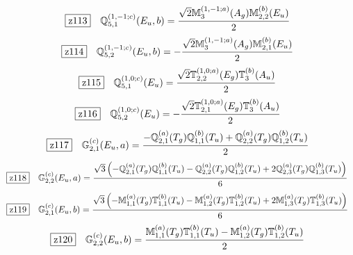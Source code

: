 \documentclass[fleqn,10pt,landscape]{jsarticle}
\begin{document}
\begin{dmath*}
\hspace*{3mm}\fbox{z113}\quad \mathbb{Q}_{5,1}^{(1,-1;c)}(E_{u},b)=\frac{\sqrt{2} \mathbb{M}_{3}^{(1,-1;a)}(A_{g}) \mathbb{M}_{2,2}^{(b)}(E_{u})}{2}
\end{dmath*}
\begin{dmath*}
\hspace*{3mm}\fbox{z114}\quad \mathbb{Q}_{5,2}^{(1,-1;c)}(E_{u},b)=- \frac{\sqrt{2} \mathbb{M}_{3}^{(1,-1;a)}(A_{g}) \mathbb{M}_{2,1}^{(b)}(E_{u})}{2}
\end{dmath*}
\begin{dmath*}
\hspace*{3mm}\fbox{z115}\quad \mathbb{Q}_{5,1}^{(1,0;c)}(E_{u})=\frac{\sqrt{2} \mathbb{T}_{2,2}^{(1,0;a)}(E_{g}) \mathbb{T}_{3}^{(b)}(A_{u})}{2}
\end{dmath*}
\begin{dmath*}
\hspace*{3mm}\fbox{z116}\quad \mathbb{Q}_{5,2}^{(1,0;c)}(E_{u})=- \frac{\sqrt{2} \mathbb{T}_{2,1}^{(1,0;a)}(E_{g}) \mathbb{T}_{3}^{(b)}(A_{u})}{2}
\end{dmath*}
\begin{dmath*}
\hspace*{3mm}\fbox{z117}\quad \mathbb{G}_{2,1}^{(c)}(E_{u},a)=\frac{- \mathbb{Q}_{2,1}^{(a)}(T_{g}) \mathbb{Q}_{1,1}^{(b)}(T_{u}) + \mathbb{Q}_{2,2}^{(a)}(T_{g}) \mathbb{Q}_{1,2}^{(b)}(T_{u})}{2}
\end{dmath*}
\begin{dmath*}
\hspace*{3mm}\fbox{z118}\quad \mathbb{G}_{2,2}^{(c)}(E_{u},a)=\frac{\sqrt{3} \left(- \mathbb{Q}_{2,1}^{(a)}(T_{g}) \mathbb{Q}_{1,1}^{(b)}(T_{u}) - \mathbb{Q}_{2,2}^{(a)}(T_{g}) \mathbb{Q}_{1,2}^{(b)}(T_{u}) + 2 \mathbb{Q}_{2,3}^{(a)}(T_{g}) \mathbb{Q}_{1,3}^{(b)}(T_{u})\right)}{6}
\end{dmath*}
\begin{dmath*}
\hspace*{3mm}\fbox{z119}\quad \mathbb{G}_{2,1}^{(c)}(E_{u},b)=\frac{\sqrt{3} \left(- \mathbb{M}_{1,1}^{(a)}(T_{g}) \mathbb{T}_{1,1}^{(b)}(T_{u}) - \mathbb{M}_{1,2}^{(a)}(T_{g}) \mathbb{T}_{1,2}^{(b)}(T_{u}) + 2 \mathbb{M}_{1,3}^{(a)}(T_{g}) \mathbb{T}_{1,3}^{(b)}(T_{u})\right)}{6}
\end{dmath*}
\begin{dmath*}
\hspace*{3mm}\fbox{z120}\quad \mathbb{G}_{2,2}^{(c)}(E_{u},b)=\frac{\mathbb{M}_{1,1}^{(a)}(T_{g}) \mathbb{T}_{1,1}^{(b)}(T_{u}) - \mathbb{M}_{1,2}^{(a)}(T_{g}) \mathbb{T}_{1,2}^{(b)}(T_{u})}{2}
\end{dmath*}
\end{document}
